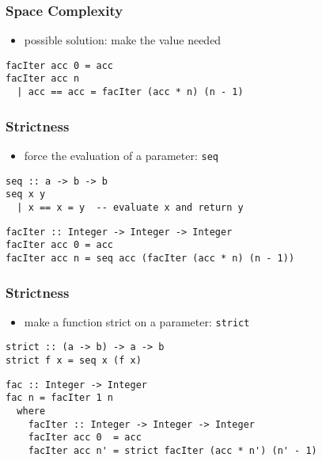 \documentclass[dvipsnames]{beamer}
\theoremstyle{plain}
\begin{document}
\begin{frame}[fragile]
  \frametitle{Space Complexity}

  \begin{itemize}
    \item possible solution: make the value needed
  \end{itemize}

  \begin{exampleblock}{}
    \begin{lstlisting}
facIter acc 0 = acc
facIter acc n
  | acc == acc = facIter (acc * n) (n - 1)
    \end{lstlisting}
  \end{exampleblock}
\end{frame}

\begin{frame}[fragile]
  \frametitle{Strictness}

  \begin{itemize}
    \item force the evaluation of a parameter:
      \lstinline|seq|
  \end{itemize}

  \begin{exampleblock}{}
    \begin{lstlisting}
seq :: a -> b -> b
seq x y
  | x == x = y  -- evaluate x and return y
    \end{lstlisting}

    \pause
    \medskip
    \begin{lstlisting}
facIter :: Integer -> Integer -> Integer
facIter acc 0 = acc
facIter acc n = seq acc (facIter (acc * n) (n - 1))
    \end{lstlisting}
  \end{exampleblock}
\end{frame}

\begin{frame}[fragile]
  \frametitle{Strictness}

  \begin{itemize}
    \item make a function strict on a parameter:
      \lstinline|strict|
  \end{itemize}

  \begin{exampleblock}{}
    \begin{lstlisting}
strict :: (a -> b) -> a -> b
strict f x = seq x (f x)
    \end{lstlisting}

    \pause
    \medskip
    \begin{lstlisting}
fac :: Integer -> Integer
fac n = facIter 1 n
  where
    facIter :: Integer -> Integer -> Integer
    facIter acc 0  = acc
    facIter acc n' = strict facIter (acc * n') (n' - 1)
    \end{lstlisting}
  \end{exampleblock}
\end{frame}
\end{document}
